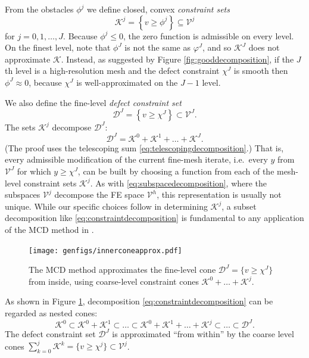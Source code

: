 \documentclass[letterpaper,final,12pt,reqno]{amsart}
\theoremstyle{claim}
\numberwithin{equation}{section}
\numberwithin{figure}{section}
\numberwithin{table}{section}
\numberwithin{theorem}{section}
\begin{document}
From the obstacles $\phi^j$ we define closed, convex \emph{constraint sets}
\begin{equation}
\mathcal{K}^j = \left\{v \ge \phi^j\right\} \subseteq \mathcal{V}^j \label{eq:defineKj}
\end{equation}
for $j=0,1,\dots,J$.  Because $\phi^j \le 0$, the zero function is admissible on every level.  On the finest level, note that $\phi^J$ is not the same as $\varphi^J$, and so $\mathcal{K}^J$ does not approximate $\mathcal{K}$.  Instead, as suggested by Figure \ref{fig:gooddecomposition}, if the $J$th level is a high-resolution mesh and the defect constraint $\chi^J$ is smooth then $\phi^J\approx 0$, because $\chi^J$ is well-approximated on the $J-1$ level.

We also define the fine-level \emph{defect constraint set}
\begin{equation}
  \mathcal{D}^J = \left\{v \ge \chi^J\right\} \subset \mathcal{V}^J.
\end{equation}
The sets $\mathcal{K}^j$ decompose $\mathcal{D}^J$:
\begin{equation}
  \mathcal{D}^J = \mathcal{K}^0 + \mathcal{K}^1 + \dots + \mathcal{K}^J. \label{eq:constraintdecomposition}
\end{equation}
(The proof uses the telescoping sum \eqref{eq:telescopingdecomposition}.)  That is, every admissible modification of the current fine-mesh iterate, i.e.~every $y$ from $\mathcal{V}^J$ for which $y\ge \chi^J$, can be built by choosing a function from each of the mesh-level constraint sets $\mathcal{K}^j$.  As with \eqref{eq:subspacedecomposition}, where the subspaces $\mathcal{V}^j$ decompose the FE space $\mathcal{V}^h$, this representation is usually not unique.  While our specific choices follow \cite{GraeserKornhuber2009} in determining $\mathcal{K}^j$, a subset decomposition like \eqref{eq:constraintdecomposition} is fundamental to any application of the MCD method in \cite{Tai2003}.

\begin{figure}
\texttt{[image: genfigs/innerconeapprox.pdf]}

\caption{The MCD method approximates the fine-level cone $\mathcal{D}^J = \{v\ge \chi^J\}$ from inside, using coarse-level constraint cones $\mathcal{K}^0+\dots+\mathcal{K}^j$.}
\label{fig:innerconeapprox}
\end{figure}

As shown in Figure \ref{fig:innerconeapprox}, decomposition \eqref{eq:constraintdecomposition} can be regarded as nested cones:
\begin{equation}
  \mathcal{K}^0 \subset \mathcal{K}^0 + \mathcal{K}^1 \subset \dots \subset \mathcal{K}^0 + \mathcal{K}^1 + \dots + \mathcal{K}^j \subset \dots \subset \mathcal{D}^J.  \label{eq:nestedcones}
\end{equation}
The defect constraint set $\mathcal{D}^J$ is approximated ``from within'' by the coarse level cones $\sum_{k=0}^j \mathcal{K}^k = \{v \ge \chi^j\} \subset \mathcal{V}^j$.
\end{document}
